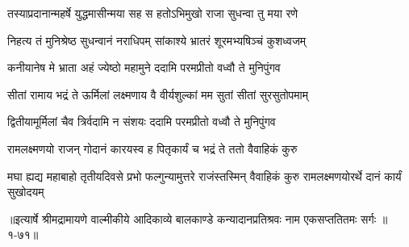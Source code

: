 \twolineshloka
{तस्याप्रदानान्महर्षे युद्धमासीन्मया सह}
{स हतोऽभिमुखो राजा सुधन्वा तु मया रणे} %

\twolineshloka
{निहत्य तं मुनिश्रेष्ठ सुधन्वानं नराधिपम्}
{सांकाश्ये भ्रातरं शूरमभ्यषिञ्चं कुशध्वजम्} %

\twolineshloka
{कनीयानेष मे भ्राता अहं ज्येष्ठो महामुने}
{ददामि परमप्रीतो वध्वौ ते मुनिपुंगव} %

\twolineshloka
{सीतां रामाय भद्रं ते ऊर्मिलां लक्ष्मणाय वै}
{वीर्यशुल्कां मम सुतां सीतां सुरसुतोपमाम्} %

\twolineshloka
{द्वितीयामूर्मिलां चैव त्रिर्वदामि न संशयः}
{ददामि परमप्रीतो वध्वौ ते मुनिपुंगव} %

\twolineshloka
{रामलक्ष्मणयो राजन् गोदानं कारयस्व ह}
{पितृकार्यं च भद्रं ते ततो वैवाहिकं कुरु} %

\threelineshloka
{मघा ह्यद्य महाबाहो तृतीयदिवसे प्रभो}
{फल्गुन्यामुत्तरे राजंस्तस्मिन् वैवाहिकं कुरु}
{रामलक्ष्मणयोरर्थे दानं कार्यं सुखोदयम्} %


॥इत्यार्षे श्रीमद्रामायणे वाल्मीकीये आदिकाव्ये बालकाण्डे कन्यादानप्रतिश्रवः नाम एकसप्ततितमः सर्गः ॥१-७१॥
